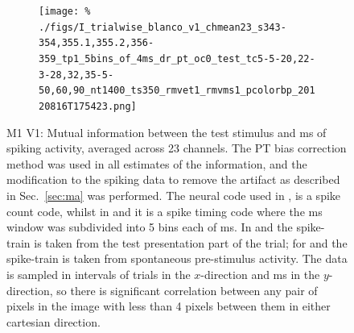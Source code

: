 \begin{figure}[htbp]
\begin{subfigure}[b]{0.5\linewidth}
        \texttt{[image: \%
./figs/I\_trialwise\_blanco\_v1\_chmean23\_s343-354,355.1,355.2,356-359\_tp1\_5bins\_of\_4ms\_dr\_pt\_oc0\_test\_tc5-5-20,22-3-28,32,35-5-50,60,90\_nt1400\_ts350\_rmvet1\_rmvms1\_pcolorbp\_20120816T175423.png]}
    \end{subfigure}
    \caption{M1 V1: Mutual information between the test stimulus and \unit[20]{ms} of spiking activity, averaged across 23 channels.
The PT bias correction method was used in all estimates of the information, and the modification to the spiking data to remove the artifact as described in Sec.~\ref{sec:ma} was performed.
The neural code used in ,  is a spike count code, whilst in  and  it is a spike timing code where the \unit[20]{ms} window was subdivided into 5 bins each of \unit[4]{ms}.
In  and  the spike-train is taken from the test presentation part of the trial;
for  and  the spike-train is taken from spontaneous pre-stimulus activity.
The data is sampled in intervals of \unit[350]{trials} in the $x$-direction and \unit[5]{ms} in the $y$-direction, so there is significant correlation between any pair of pixels in the image with less than 4 pixels between them in either cartesian direction.
}
    \label{fig:b1-trialwise}
\end{figure}



